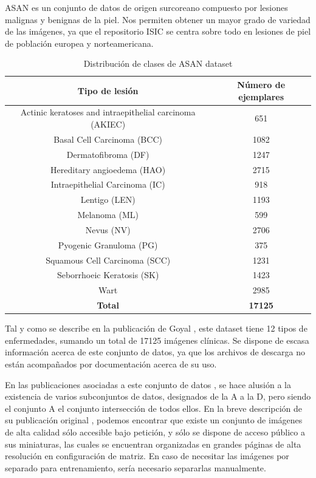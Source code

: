 ASAN \cite{Han2017,HAN20181529,HAN20189} es un conjunto de datos de origen surcoreano compuesto por lesiones malignas y benignas de la piel. Nos permiten obtener un mayor grado de variedad de las imágenes, ya que el repositorio ISIC se centra sobre todo en lesiones de piel de población europea y norteamericana.

\begin{table}[H]
	\centering
	\begin{tabular}{|c|c|}
		\hline
		\textbf{Tipo de lesión} & \textbf{Número de ejemplares} \\ \hline
		{Actinic keratoses and intraepithelial carcinoma (AKIEC)} & 651 \\ \hline
		{Basal Cell Carcinoma (BCC)} & 1082 \\ \hline
		{Dermatofibroma (DF)} & 1247 \\ \hline
		{Hereditary angioedema (HAO)} & 2715 \\ \hline
		{Intraepithelial Carcinoma (IC)} & 918 \\ \hline
		{Lentigo (LEN)} & 1193 \\ \hline
		{Melanoma (ML)} & 599 \\ \hline
		{Nevus (NV)} & 2706 \\ \hline
		{Pyogenic Granuloma (PG)}  & 375 \\ \hline
		{Squamous Cell Carcinoma (SCC)} & 1231 \\ \hline
		{Seborrhoeic Keratosis (SK)}  & 1423 \\ \hline
		{Wart} & 2985 \\ \hline
		\textbf{Total} & \textbf{17125} \\ \hline
	\end{tabular}
	\caption{Distribución de clases de ASAN dataset}
\end{table}

Tal y como se describe en la publicación de Goyal \cite{goyal2020artificial} , este dataset tiene 12 tipos de enfermedades, sumando un total de 17125 imágenes clínicas. Se dispone de escasa información acerca de este conjunto de datos, ya que los archivos de descarga no están acompañados por documentación acerca de su uso.


En las publicaciones asociadas a este conjunto de datos \cite{Han2017,HAN20181529,HAN20189}, se hace alusión a la existencia de varios subconjuntos de datos, designados de la A a la D, pero siendo el conjunto A el conjunto intersección de todos ellos. En la breve descripción de su publicación original \cite{Han2017}, podemos encontrar que existe un conjunto de imágenes de alta calidad sólo accesible bajo petición, y sólo se dispone de acceso público a sus miniaturas, las cuales se encuentran organizadas en grandes páginas de alta resolución en configuración de matriz. En caso de necesitar las imágenes por separado para entrenamiento, sería necesario separarlas manualmente.

